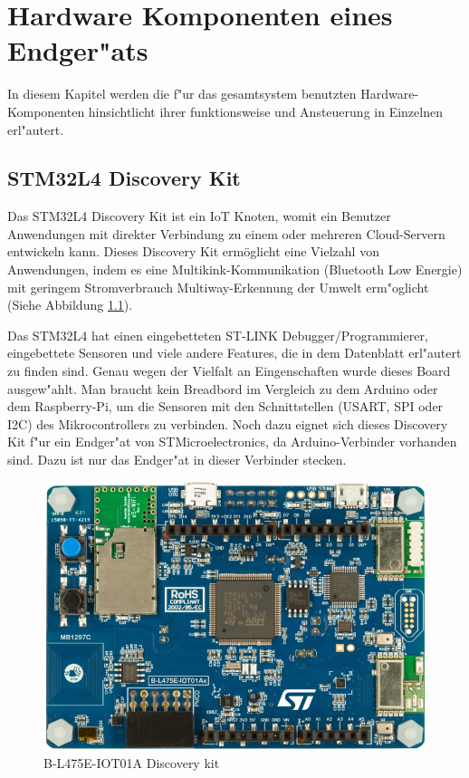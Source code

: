 \chapter{Hardware Komponenten eines Endger"ats}\label{Komponente}

In diesem Kapitel werden die f"ur das gesamtsystem benutzten 
Hardware-Komponenten hinsichtlicht ihrer funktionsweise und Ansteuerung 
in Einzelnen erl"autert. 

\section{STM32L4 Discovery Kit}\label{LoRa}

Das STM32L4 Discovery Kit ist ein IoT Knoten, womit ein Benutzer 
Anwendungen mit direkter Verbindung zu einem oder mehreren 
Cloud-Servern entwickeln kann.
Dieses Discovery Kit erm\"oglicht eine Vielzahl von Anwendungen, indem 
es eine Multikink-Kommunikation (Bluetooth Low Energie) mit geringem 
Stromverbrauch  Multiway-Erkennung der Umwelt erm"oglicht (Siehe 
Abbildung \ref{Node}).

Das STM32L4 hat einen eingebetteten ST-LINK Debugger/Programmierer, 
eingebettete Sensoren und viele andere Features, die in dem Datenblatt 
\cite{B-L475E-IOT01A} erl"autert zu finden sind. Genau wegen der 
Vielfalt an Eingenschaften wurde dieses Board ausgew"ahlt. Man braucht 
kein Breadbord im Vergleich zu dem Arduino oder dem Raspberry-Pi, um 
die Sensoren mit den Schnittstellen (USART, SPI oder I2C) des 
Mikrocontrollers zu verbinden. Noch dazu eignet sich dieses Discovery 
Kit f"ur ein Endger"at von STMicroelectronics, da Arduino-Verbinder 
vorhanden sind. Dazu ist nur das Endger"at in dieser Verbinder stecken. 

\begin{figure}[h]
	\centering
	\includegraphics[width=12cm]{source/images/Board}
	\caption{B-L475E-IOT01A Discovery kit 
	\cite{B-L475E-IOT01A}}\label{Node}
\end{figure}

